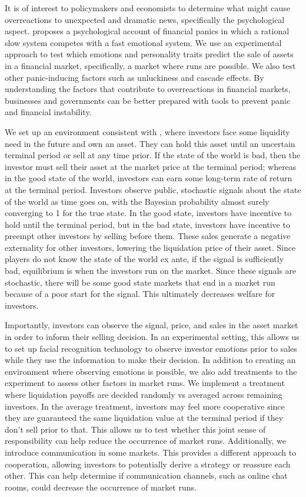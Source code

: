 \documentclass[thesis]{uathesis}
\begin{document}
\begin{body}
It is of interest to policymakers and economists to determine what might cause overreactions to unexpected and dramatic news, specifically the psychological aspect. \cite{bracha2012psychological} proposes a psychological account of financial panics in which a rational slow system competes with a fast emotional system. We use an experimental approach to test which emotions and personality traits predict the sale of assets in a financial market, specifically, a market where runs are possible. We also test other panic-inducing factors such as unluckiness and cascade effects. By understanding the factors that contribute to overreactions in financial markets, businesses and governments can be better prepared with tools to prevent panic and financial instability.

We set up an environment consistent with \cite{bernardo2004liquidity}, where investors face some liquidity need in the future and own an asset. They can hold this asset until an uncertain terminal period or sell at any time prior. If the state of the world is bad, then the investor must sell their asset at the market price at the terminal period; whereas in the good state of the world, investors can earn some long-term rate of return at the terminal period. Investors observe public, stochastic signals about the state of the world as time goes on, with the Bayesian probability almost surely converging to 1 for the true state. In the good state, investors have incentive to hold until the terminal period, but in the bad state, investors have incentive to preempt other investors by selling before them. These sales generate a negative externality for other investors, lowering the liquidation price of their asset. Since players do not know the state of the world ex ante, if the signal is sufficiently bad, equilibrium is when the investors run on the market. Since these signals are stochastic, there will be some good state markets that end in a market run because of a poor start for the signal. This ultimately decreases welfare for investors.

Importantly, investors can observe the signal, price, and sales in the asset market in order to inform their selling decision. In an experimental setting, this allows us to set up facial recognition technology to observe investor emotions prior to sales while they use the information to make their decision. In addition to creating an environment where observing emotions is possible, we also add treatments to the experiment to assess other factors in market runs. We implement a treatment where liquidation payoffs are decided randomly vs averaged across remaining investors. In the average treatment, investors may feel more cooperative since they are guaranteed the same liquidation value at the terminal period if they don't sell prior to that. This allows us to test whether this joint sense of responsibility can help reduce the occurrence of market runs. Additionally, we introduce communication in some markets. This provides a different approach to cooperation, allowing investors to potentially derive a strategy or reassure each other. This can help determine if communication channels, such as online chat rooms, could decrease the occurrence of market runs.


\end{body}
\end{document}
